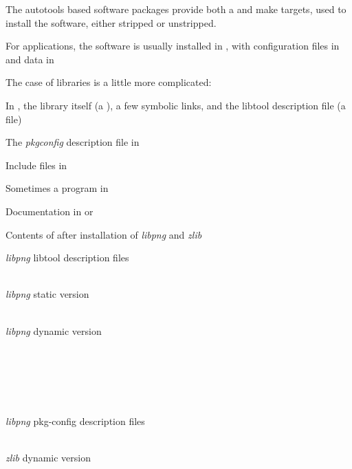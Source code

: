  \startitemize
  \item The autotools based software packages provide both a
     and  make targets, used to
    install the software, either stripped or unstripped.
  \item For applications, the software is usually installed in
    , with configuration files in
     and data in
  \item The case of libraries is a little more complicated:
    \startitemize
    \item In , the library itself (a
      ), a few symbolic links, and
      the libtool description file (a  file)
    \item The {\em pkgconfig} description file in
    \item Include files in 
    \item Sometimes a  program in
    \item Documentation in  or
    \stopitemize
  \stopitemize


Contents of  after installation of {\em libpng} and {\em
  zlib}

\startitemize
\item {\em libpng} libtool description files\\
  \\
\item {\em libpng} static version\\
  \\
\item {\em libpng} dynamic version\\
  \\
  \\
  \\
  \\
  \\
\item {\em libpng} pkg-config description files\\
  \\
\item {\em zlib} dynamic version\\
  \\
  \\
\stopitemize

